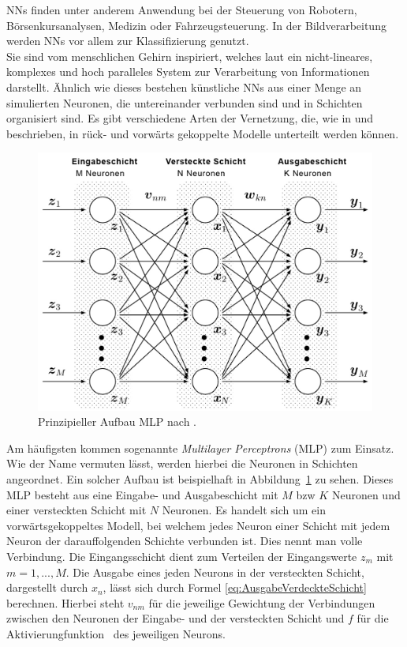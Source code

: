 \documentclass[times, 12pt,twocolumn]{article}
\begin{document}
NNs finden unter anderem Anwendung bei der Steuerung von Robotern, Börsenkursanalysen, Medizin oder Fahrzeugsteuerung. In der Bildverarbeitung werden NNs vor allem zur Klassifizierung genutzt. \\
Sie sind vom menschlichen Gehirn inspiriert, welches laut \cite{NNHaykin} ein nicht-lineares, komplexes und hoch paralleles System zur Verarbeitung von Informationen darstellt. Ähnlich wie dieses bestehen künstliche NNs aus einer Menge an simulierten Neuronen, die untereinander verbunden sind und in Schichten organisiert sind. Es gibt verschiedene Arten der Vernetzung, die, wie in \cite{NNHaykin} und \cite{NNStanley} beschrieben, in rück- und vorwärts gekoppelte Modelle unterteilt werden können.\\

\begin{figure}
	\flushleft
	\includegraphics[width=\columnwidth]{Bilder/structure-mlp.jpg}
	\caption{Prinzipieller Aufbau MLP nach \cite{MDPI}.}
	\label{fig:MLP}
\end{figure}

Am häufigsten kommen sogenannte \textit{Multilayer Perceptrons} (MLP)  \cite{NNBraun}\cite{NNNauck}\cite{NNStanley} zum Einsatz. Wie der Name vermuten lässt, werden hierbei die Neuronen in Schichten angeordnet. Ein solcher Aufbau ist beispielhaft in Abbildung~\ref{fig:MLP} zu sehen. Dieses MLP besteht aus eine Eingabe- und Ausgabeschicht mit $M$ bzw $K$ Neuronen und einer versteckten Schicht mit $N$ Neuronen. Es handelt sich um ein vorwärtsgekoppeltes Modell, bei welchem jedes Neuron einer Schicht mit jedem Neuron der darauffolgenden Schichte verbunden ist. Dies nennt man volle Verbindung. Die Eingangsschicht dient zum Verteilen der Eingangswerte $z_m$ mit $m=1,...,M$. Die Ausgabe eines jeden Neurons in der versteckten Schicht, dargestellt durch $x_n$, lässt sich durch Formel \ref{eq:AusgabeVerdeckteSchicht} berechnen. Hierbei steht $v_{nm}$ für die jeweilige Gewichtung der Verbindungen zwischen den Neuronen der Eingabe- und der versteckten Schicht und $f$ für die Aktivierungfunktion~\cite{NNStanley}\cite{NNHaykin} des jeweiligen Neurons. 
\end{document}
